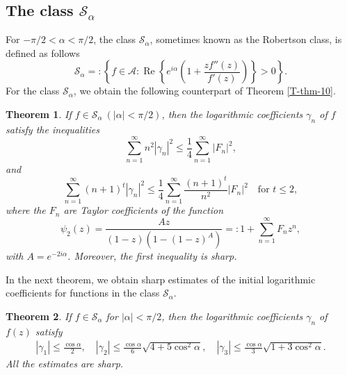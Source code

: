 \documentclass[a4paper,12pt]{amsart}
\newtheorem{thm}{Theorem}[section]
\theoremstyle{definition}
\newcounter {own}
\begin{document}
\subsection{The class $\mathcal{S}_\alpha$}
For \(-\pi/2 < \alpha < \pi/2\), the class \(\mathcal{S}_{\alpha}\), sometimes known as the Robertson class, is defined as follows
\[
\mathcal{S}_{\alpha} =: \left\{ f \in \mathcal{A} : \operatorname{Re} \left\{ e^{i\alpha} \left( 1 + \frac{z f''(z)}{f'(z)} \right) \right\} > 0\right\}.
\]
For the class $\mathcal{S}_\alpha$, we obtain the following counterpart of Theorem \ref{T-thm-10}.




\begin{thm}\label{T-thm-30}
If $ f \in \mathcal{S}_\alpha ~(|\alpha|<\pi/2)$, then the logarithmic coefficients $\gamma_n$ of $ f $ satisfy the inequalities  
$$
\sum_{n=1}^{\infty} n^2 |\gamma_n|^2 \leq \frac{1}{4} \sum_{n=1}^{\infty} |F_n|^2,
$$
and  
$$
\sum_{n=1}^{\infty} (n+1)^t |\gamma_n|^2 \leq \frac{1}{4} \sum_{n=1}^{\infty} \frac{(n+1)^t}{n^2} |F_n|^2 \quad \text{for } t \leq 2,
$$
where the $F_n$ are Taylor coefficients of the function  
$$
\psi_2(z) = \frac{Az}{(1-z)(1-(1-z)^{A})} =: 1 + \sum_{n=1}^{\infty} F_n z^n,
$$
with $A=e^{-2i\alpha }$. Moreover, the first inequality is sharp.   

\end{thm}



In the next theorem, we obtain sharp estimates of the initial logarithmic coefficients for functions in the class $\mathcal{S}_\alpha$.

\begin{thm}\label{T-thm-40}
If $f \in \mathcal{S}_\alpha$ for $|\alpha| < \pi/2$, then the logarithmic coefficients $\gamma_n$ of $f(z)$ satisfy
     \begin{align*}
  |\gamma_1| \leq \frac{\cos\alpha}{2}, \quad
|\gamma_2| \leq \frac{\cos\alpha}{6}\sqrt{4+5\cos^2\alpha}, \quad
|\gamma_3| \leq \frac{\cos\alpha}{3}\sqrt{1+3\cos^2\alpha}.
 \end{align*}
 All the estimates are sharp.  
\end{thm}
\end{document}
